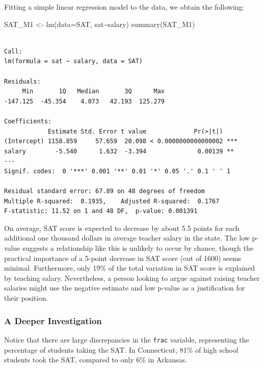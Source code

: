 \documentclass[
  letterpaper,
  DIV=11,
  numbers=noendperiod]{scrreprt}
\newenvironment{Shaded}{\begin{snugshade}}{\end{snugshade}}
\newcommand{\AttributeTok}[1]{\textcolor[rgb]{0.40,0.45,0.13}{#1}}
\newcommand{\FunctionTok}[1]{\textcolor[rgb]{0.28,0.35,0.67}{#1}}
\newcommand{\NormalTok}[1]{\textcolor[rgb]{0.00,0.23,0.31}{#1}}
\newcommand{\OtherTok}[1]{\textcolor[rgb]{0.00,0.23,0.31}{#1}}
\newcommand{\SpecialCharTok}[1]{\textcolor[rgb]{0.37,0.37,0.37}{#1}}
\begin{document}
Fitting a simple linear regression model to the data, we obtain the
following:

\begin{Shaded}
\begin{Highlighting}[]
\NormalTok{SAT\_M1 }\OtherTok{\textless{}{-}} \FunctionTok{lm}\NormalTok{(}\AttributeTok{data=}\NormalTok{SAT, sat}\SpecialCharTok{\textasciitilde{}}\NormalTok{salary)}
\FunctionTok{summary}\NormalTok{(SAT\_M1)}
\end{Highlighting}
\end{Shaded}

\begin{verbatim}

Call:
lm(formula = sat ~ salary, data = SAT)

Residuals:
     Min       1Q   Median       3Q      Max 
-147.125  -45.354    4.073   42.193  125.279 

Coefficients:
            Estimate Std. Error t value             Pr(>|t|)    
(Intercept) 1158.859     57.659  20.098 < 0.0000000000000002 ***
salary        -5.540      1.632  -3.394              0.00139 ** 
---
Signif. codes:  0 '***' 0.001 '**' 0.01 '*' 0.05 '.' 0.1 ' ' 1

Residual standard error: 67.89 on 48 degrees of freedom
Multiple R-squared:  0.1935,    Adjusted R-squared:  0.1767 
F-statistic: 11.52 on 1 and 48 DF,  p-value: 0.001391
\end{verbatim}

On average, SAT score is expected to decrease by about 5.5 points for
each additional one thousand dollars in average teacher salary in the
state. The low p-value suggests a relationship like this is unlikely to
occur by chance, though the practical importance of a 5-point decrease
in SAT score (out of 1600) seems minimal. Furthermore, only 19\% of the
total variation in SAT score is explained by teaching salary.
Nevertheless, a person looking to argue against raising teacher salaries
might use the negative estimate and low p-value as a justification for
their position.

\subsubsection{A Deeper Investigation}\label{a-deeper-investigation}

Notice that there are large discrepancies in the \texttt{frac} variable,
representing the percentage of students taking the SAT. In Connecticut,
81\% of high school students took the SAT, compared to only 6\% in
Arkansas.
\end{document}
